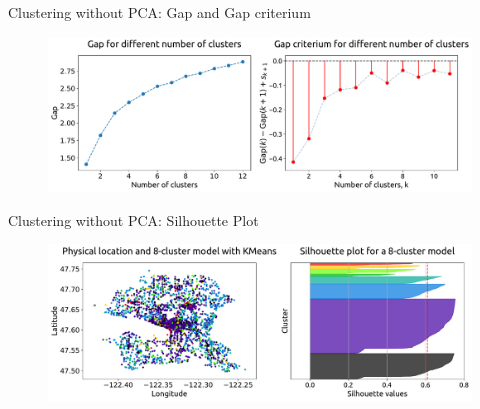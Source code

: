 \documentclass[t,11pt,compress,xcolor=table,hyperref={bookmarks=false}]{beamer}
\begin{document}
\begin{frame}{Clustering without PCA: Gap and Gap criterium}
\begin{figure}
\hspace*{-0.9cm}\includegraphics[scale=0.35]{figs/NO_PCA_parfigs_2.pdf}
\end{figure}

\end{frame}


\begin{frame}{Clustering without PCA: Silhouette Plot}
\begin{figure}
\hspace*{-0.9cm}\includegraphics[scale=0.35]{figs/NO_PCA_clusfigs_8_cluster.pdf}
\end{figure}
\end{frame}
\end{document}

